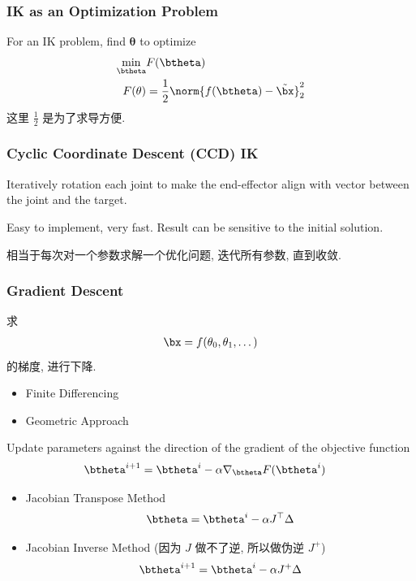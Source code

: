 \subsubsection{IK as an Optimization Problem}
For an IK problem, find $\bm\theta$ to optimize
\begin{align*}
    \min_{\btheta} &F(\btheta)\\
    F(\theta)&=\frac{1}{2}\norm{f(\btheta)-\tilde{\bx}}_2^2
\end{align*}
这里 $\frac{1}{2}$ 是为了求导方便. 

\subsubsection{Cyclic Coordinate Descent (CCD) IK}
Iteratively rotation each joint to make the end-effector align with vector between the joint and the target.

Easy to implement, very fast. Result can be sensitive to the initial solution.

相当于每次对一个参数求解一个优化问题, 迭代所有参数, 直到收敛.

\subsubsection{Gradient Descent}
求 
\begin{align*}
    \bx=f(\theta_0,\theta_1,\dots)
\end{align*}
的梯度, 进行下降. 

\begin{itemize}
    \item Finite Differencing
    \item Geometric Approach
\end{itemize}



Update parameters against the direction of the gradient of the objective function
\begin{align*}
    \btheta^{i+1}&=\btheta^i-\alpha \nabla_\btheta F(\btheta^i)
\end{align*}
\begin{itemize}
    \item Jacobian Transpose Method
    \begin{align*}
        \btheta=\btheta^i-\alpha J^\top \Delta
    \end{align*}
    \item Jacobian Inverse Method (因为 $J$ 做不了逆, 所以做伪逆 $J^+$)
    \begin{align*}
        \btheta^{i+1}=\btheta^i-\alpha J^+ \Delta
    \end{align*}
\end{itemize}

